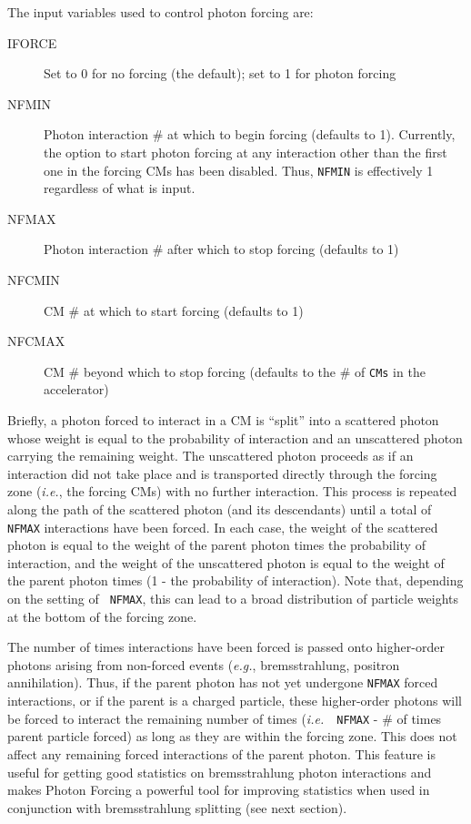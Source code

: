 \documentclass[12pt,twoside]{article}
\newcommand{\ie}{{\em i.e.}}
\begin{document}
The input variables used to control photon forcing are:
\begin{description}
\item [IFORCE] Set to 0 for no forcing (the default); set to 1 for photon
forcing
\item [NFMIN] Photon interaction \# at which to begin forcing (defaults to 1).
Currently, the option to start photon forcing at any interaction other than the
first one in the forcing CMs has been disabled.  Thus, {\tt NFMIN} is
effectively 1 regardless of what is input.
\item [NFMAX] Photon interaction \# after which to stop forcing (defaults to 1)
\item [NFCMIN] CM \# at which to start forcing (defaults to 1)
\item [NFCMAX] CM \# beyond which to stop forcing (defaults
to the \# of  \verb+CMs+ in the accelerator)

\end{description}
 

Briefly, a photon forced to interact in a CM is ``split'' into a scattered
photon whose weight is equal to the probability of interaction and an
unscattered photon carrying the remaining weight.  The unscattered photon
proceeds as if an interaction did not take place and is transported directly
through the forcing zone ({\em i.e.}, the forcing CMs) with no further
interaction.  This process is repeated along the path of the scattered photon
(and its descendants) until a total of {\tt NFMAX} interactions have been
forced.  In each case, the weight of the scattered photon is equal to the weight
of the parent photon times the probability of interaction, and the weight of the
unscattered photon is equal to the weight of the parent photon times (1 - the
probability of interaction).  Note that, depending on the setting of {\tt
NFMAX}, this can lead to a broad distribution of particle weights at the bottom
of the forcing zone.

The number of times interactions have been forced is passed onto higher-order
photons arising from non-forced events ({\em e.g.}, bremsstrahlung, positron
annihilation).  Thus, if the parent photon has not yet undergone {\tt NFMAX}
forced interactions, or if the parent is a charged particle, these higher-order
photons will be forced to interact the remaining number of times (\ie\ {\tt
NFMAX} - \# of times parent particle forced) as long as they are within the
forcing zone.  This does not affect any remaining forced interactions of the
parent photon.  This feature is useful for getting good statistics on
bremsstrahlung photon interactions and makes Photon Forcing
a powerful tool for improving statistics when used in conjunction with
bremsstrahlung splitting (see next section).
\end{document}

